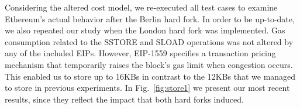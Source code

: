 Considering the altered cost model, we re-executed all test cases to examine Ethereum’s actual behavior after the Berlin hard fork. In order to be up-to-date, we also repeated our study when the London hard fork was implemented. Gas consumption related to the SSTORE and SLOAD operations was not altered by any of the included EIPs. However, EIP-1559 specifies a transaction pricing mechanism that temporarily raises the block’s gas limit when congestion occurs. This enabled us to store up to 16KBs in contrast to the 12KBs that we managed to store in previous experiments. In Fig.~\ref{fig:store1} we present our most recent results, since they reflect the impact that both hard forks induced.

\begin{table}[htbp]
\caption{Impact of the Optional Access List}
\label{table:access_list}
\end{table}
